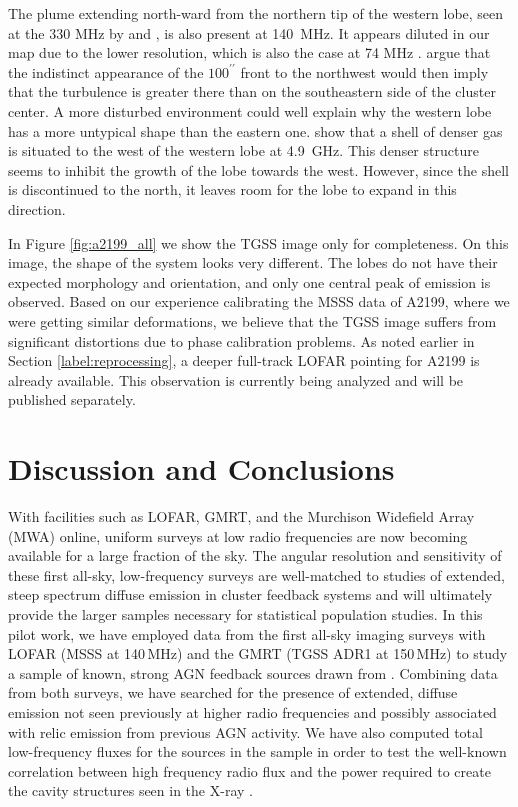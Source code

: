 \documentclass{aa}  %
\begin{document}
The plume extending north-ward from the northern tip of the western lobe, seen at the 330 MHz by \cite{Gentile2007} and \cite{Birzan2008}, is also present at 140~MHz. 
It appears diluted in our map due to the lower resolution, which is also the case at 74 MHz \citep{Gentile2007}.  
\cite{Nulsen2013} argue that the indistinct appearance of the $100^{\prime\prime}$ front to the northwest would then imply that the turbulence is greater there than on the southeastern side of the cluster center.
A more disturbed environment could well explain why the western lobe has a more untypical shape than the eastern one.
\cite{Nulsen2013} show that a shell of denser gas is situated to the west of the western lobe at 4.9~GHz.
This denser structure seems to inhibit the growth of the lobe towards the west. However, since the shell is discontinued to the north, it leaves room for the lobe to expand in this direction.

In Figure \ref{fig:a2199_all} we show the TGSS image only for completeness.
On this image, the shape of the system looks very different.
The lobes do not have their expected morphology and orientation, and only one central peak of emission is observed.
Based on our experience calibrating the MSSS data of A2199, where we were getting similar deformations, we believe that the TGSS image suffers from significant distortions due to phase calibration problems.
As noted earlier in Section \ref{label:reprocessing}, a deeper full-track LOFAR pointing for A2199 is already available. 
This observation is currently being analyzed and will be published separately. 






\section{Discussion and Conclusions}
\label{sec:conclusions}

With facilities such as LOFAR, GMRT, and the Murchison Widefield Array (MWA) online, uniform surveys at low radio frequencies are now becoming available for a large fraction of the sky. The angular resolution and sensitivity of these first all-sky, low-frequency surveys are well-matched to studies of extended, steep spectrum diffuse emission in cluster feedback systems and will ultimately provide the larger samples necessary for statistical population studies. In this pilot work, we have employed data from the first all-sky imaging surveys with LOFAR (MSSS at 140\,MHz) and the GMRT (TGSS ADR1 at 150\,MHz) to study a sample of known, strong AGN feedback sources drawn from \cite{Birzan2008}. Combining data from both surveys, we have searched for the presence of extended, diffuse emission not seen previously at higher radio frequencies and possibly associated with relic emission from previous AGN activity. We have also computed total low-frequency fluxes for the sources in the sample in order to test the well-known correlation between high frequency radio flux and the power required to create the cavity structures seen in the X-ray \citep{Birzan2008, Rafferty2006}. 
\end{document}
